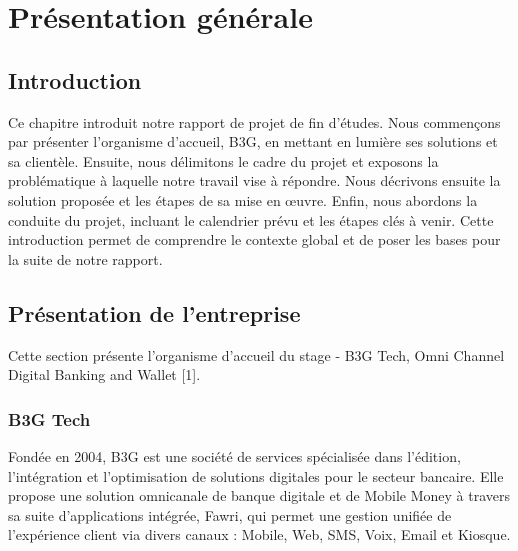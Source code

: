 \chapter{Présentation générale}
\label{chap:Présentation générale}


\section*{Introduction}

\hspace{\parindent}Ce chapitre introduit notre rapport de projet de fin d'études. Nous commençons par présenter l'organisme d'accueil, B3G, en mettant en lumière ses solutions et sa clientèle. Ensuite, nous délimitons le cadre du projet et exposons la problématique à laquelle notre travail vise à répondre. Nous décrivons ensuite la solution proposée et les étapes de sa mise en œuvre. Enfin, nous abordons la conduite du projet, incluant le calendrier prévu et les étapes clés à venir. Cette introduction permet de comprendre le contexte global et de poser les bases pour la suite de notre rapport.
\newpage

\section{Présentation de l'entreprise}

\hspace{\parindent}Cette section présente l'organisme d'accueil du stage - B3G Tech, Omni Channel Digital Banking and Wallet [1].

\subsection{B3G Tech}

\hspace{\parindent}Fondée en 2004, B3G \cite{ref1} est une société de services spécialisée dans l'édition, l'intégration et l'optimisation de solutions digitales pour le secteur bancaire. Elle propose une solution omnicanale de banque digitale et de Mobile Money à travers sa suite d'applications intégrée, Fawri, qui permet une gestion unifiée de l'expérience client via divers canaux : Mobile, Web, SMS, Voix, Email et Kiosque.





